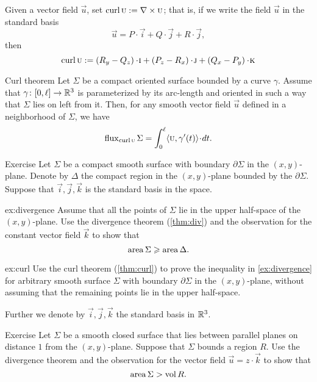 Given a vector field $\vec u$, set $\mathop{\rm curl}\nolimits \textsc u:=\nabla\times \textsc u$;
that is, if we write the field $\vec u$ in the standard basis 
\[\vec u=P\cdot \vec i+ Q\cdot\vec j+R\cdot \vec j,\]
then 
\[\curl \vec u
\df
\left(R_y-Q_z \right)\cdot \vec i 
+
\left(P_z-R_x\right) \cdot \vec j
+
\left (Q_x-P_y\right)\cdot \vec k \]

\begin{thm}{Curl theorem}\label{thm:curl}
Let $\Sigma$ be a compact oriented surface bounded by a curve $\gamma$.
Assume that $\gamma\colon[0,\ell]\to \mathbb{R}^3$ is parameterized by its arc-length and oriented in such a way that $\Sigma$ lies on left from it.
Then, for any smooth vector field $\vec u$ defined in a neighborhood of $\Sigma$, we have
\[\flux_{\curl\vec u}\Sigma
=
\int_0^\ell\langle\vec u,\gamma'(t)\rangle\cdot dt.\]

\end{thm}


\begin{thm}{Exercise}\label{ex:divergence-1}
Let $\Sigma$ be a compact smooth surface with boundary $\partial \Sigma$ in the $(x,y)$-plane.
Denote by $\Delta$ the compact region in the $(x,y)$-plane bounded by the $\partial \Sigma$.
Suppose that $\vec i,\vec j,\vec k$ is the standard basis in the space.

\begin{subthm}{ex:divergence}
Assume that all the points of $\Sigma$ lie in the upper half-space of the $(x,y)$-plane.
Use the divergence theorem (\ref{thm:div}) and the observation for the constant vector field $\vec k$
to show that 
\[\mathop{\rm area}\nolimits\Sigma\geqslant\mathop{\rm area}\nolimits\Delta.\]
\end{subthm}

\begin{subthm}{ex:curl} 
Use the curl theorem (\ref{thm:curl}) to prove the inequality in \ref{ex:divergence} for arbitrary smooth surface $\Sigma$ with boundary $\partial \Sigma$ in the $(x,y)$-plane, without assuming that the remaining points lie in the upper half-space.
\end{subthm}

\end{thm}

Further we denote by $\vec i,\vec j,\vec k$ the standard basis in $\mathbb{R}^3$.

\begin{thm}{Exercise}\label{ex:divergence-2}
Let $\Sigma$ be a smooth closed surface that lies between parallel planes on distance $1$ from the $(x,y)$-plane.
Suppose that $\Sigma$ bounds a region $R$.
Use the divergence theorem and the observation for the vector field $\vec u=z\cdot \vec k$ to  show that 
\[\mathop{\rm area}\nolimits \Sigma>\mathop{\rm vol}\nolimits R.\]
\end{thm}

